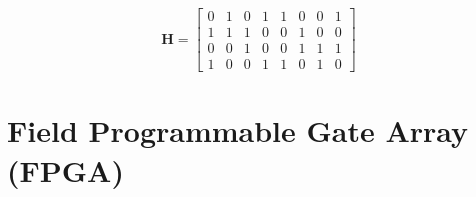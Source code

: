 \begin{equation}
	\bm{H} = \left[\begin{matrix}
		0 & 1 & 0 & 1 & 1 & 0 & 0 & 1 \\ 
		1 & 1 & 1 & 0 & 0 & 1 & 0 & 0 \\
		0 & 0 & 1 & 0 & 0 & 1 & 1 & 1 \\
		1 & 0 & 0 & 1 & 1 & 0 & 1 & 0
	\end{matrix}\right] \label{ldpc_mat}
\end{equation}



\chapter{Field Programmable Gate Array (FPGA)}
